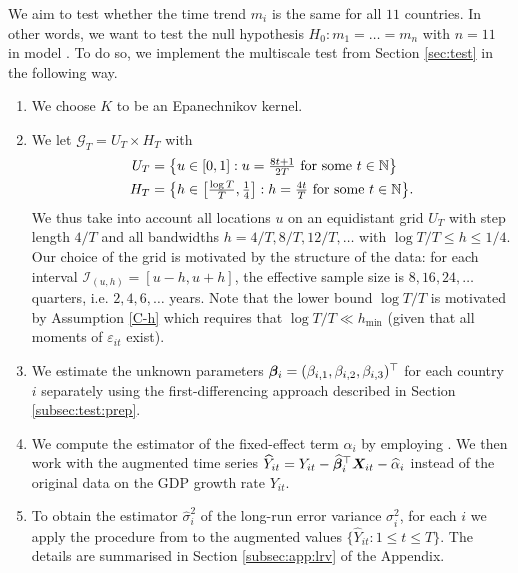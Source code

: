 \documentclass[a4paper,12pt]{article}
\makeatletter
\renewcommand{\eqref}[1]{\tagform@{\ref{#1}}}
\makeatother
\begin{document}
We aim to test whether the time trend $m_i$ is the same for all $11$ countries. In other words, we want to test the null hypothesis $H_0: m_1 = \ldots = m_n$ with $n = 11$ in model \eqref{eq:model:app2}. To do so, we implement the multiscale test from Section \ref{sec:test} in the following way. 

\begin{enumerate}
\item We choose $K$ to be an Epanechnikov kernel.
\item We let $\mathcal{G}_T = U_T \times H_T$ with 
\begin{align*}
U_T & = \big\{ u \in [0,1]: u = \textstyle{\frac{8t + 1}{2T}} \text{ for some } t \in \mathbb{N} \big\} \\
H_T & = \big\{ h \in \big[ \textstyle{\frac{\log T}{T}}, \textstyle{\frac{1}{4}} \big]:  h = \textstyle{\frac{4t}{T}} \text{ for some } t \in \mathbb{N} \big\}. 
\end{align*}
We thus take into account all locations $u$ on an equidistant grid $U_T$ with step length $4/T$ and all bandwidths $h=4/T, 8/T, 12/T,\ldots$ with $\log T /T \le h \le 1/4$. Our choice of the grid is motivated by the structure of the data: for each interval $\mathcal{I}_{(u, h)} = [u-h, u+h]$, the effective sample size is $8, 16, 24, \ldots$ quarters, i.e. $2, 4, 6, \ldots$ years. Note that the lower bound $\log T / T$ is motivated by Assumption \ref{C-h} which requires that $\log T /T \ll h_{\min}$ (given that all moments of $\varepsilon_{it}$ exist).
\item We estimate the unknown parameters $\bm{\beta}_i = (\beta_{i, 1}, \beta_{i, 2}, \beta_{i, 3})^\top$ for each country $i$ separately using the first-differencing approach described in Section \ref{subsec:test:prep}.
\item We compute the estimator of the fixed-effect term $\alpha_i$ by employing \eqref{eq:alpha:est}. We then work with the augmented time series $\widehat{Y}_{it} = Y_{it} - \widehat{\bm{\beta}}_i^\top \boldsymbol{X}_{it} - \widehat{\alpha}_{i}$ instead of the original data on the GDP growth rate $Y_{it}$.
\item To obtain the estimator $\hat{\sigma}_i^2$ of the long-run error variance $\sigma^2_i$, for each $i$ we apply the procedure from \cite{KhismatullinaVogt2020} to the augmented values \linebreak $\{\widehat{Y}_{it}: 1\leq t \leq T\}$. The details are summarised in Section \ref{subsec:app:lrv} of the Appendix. %

\end{enumerate}
\end{document}
